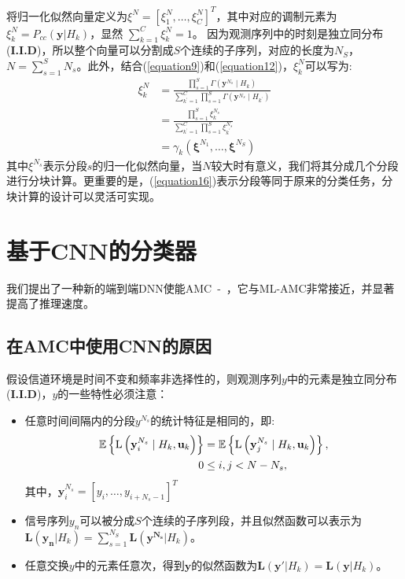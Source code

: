 \documentclass[final]{cvpr}
\begin{document}
将归一化似然向量定义为$\xi^N=[\xi^N_1,\dots,\xi^N_C]^T$，其中对应的调制元素为$\xi^N_k=P_{cc}(\mathbf{y}|H_k)$，显然
$\sum_{k=1}^C \xi^N_k = 1$。
因为观测序列中的时刻是独立同分布(\textbf{I.I.D})，所以整个向量可以分割成$S$个连续的子序列，对应的长度为$N_S$，$N=\sum^S_{s=1}N_s$。此外，结合(\ref{equation9})和(\ref{equation12})，$\xi^N_k$可以写为:
\begin{equation}
\begin{aligned}
\xi_{k}^{N} &=\frac{\prod_{s=1}^{S} \Gamma\left(\mathbf{y}^{N_{s}} \mid H_{k}\right)}{\sum_{k^{\prime}=1}^{C} \prod_{s=1}^{S} \Gamma\left(\mathbf{y}^{N_{s}} \mid H_{k^{\prime}}\right)} \\
&=\frac{\prod_{s=1}^{S} \xi_{k}^{N_{s}}}{\sum_{k^{\prime}=1}^{C} \prod_{s=1}^{S} \xi_{k^{\prime}}^{N_{s}}} \\
&=\gamma_{k}\left(\boldsymbol{\xi}^{N_{1}}, \ldots, \boldsymbol{\xi}^{N_{S}}\right)\label{equation16}
\end{aligned}
\end{equation}
其中$\xi^{N_s}$表示分段$s$的归一化似然向量，当$N$较大时有意义，我们将其分成几个分段进行分块计算。更重要的是，(\ref{equation16})表示分段等同于原来的分类任务，分块计算的设计可以灵活可实现。

\section{基于CNN的分类器}\label{CNNClassifier}

我们提出了一种新的端到端DNN使能AMC~\cite{r32}-~\cite{r34}，它与ML-AMC非常接近，并显著提高了推理速度。
\subsection{在AMC中使用CNN的原因}\label{useCNNreason}

假设信道环境是时间不变和频率非选择性的，则观测序列$y$中的元素是独立同分布(\textbf{I.I.D})，$y$的一些特性必须注意：
\begin{itemize}
\item  任意时间间隔内的分段$y^{N_s}$的统计特征是相同的，即:
\begin{equation}
\begin{aligned}
\mathbb{E}\left\{\mathrm{L}\left(\mathbf{y}_{i}^{N_{s}} \mid H_{k}, \mathbf{u}_{k}\right)\right\} &=\mathbb{E}\left\{\mathrm{L}\left(\mathbf{y}_{j}^{N_{s}} \mid H_{k}, \mathbf{u}_{k}\right)\right\}, \\
0 & \leq i, j<N-N_{s},\notag
\end{aligned}
\end{equation}
其中，$\boldsymbol{y}_i^{N_s}=[y_i,\dots,y_{i+N_s−1}]^T$
\item  信号序列$y_n$可以被分成$S$个连续的子序列段，并且似然函数可以表示为$\boldsymbol{L}(\boldsymbol{y_n}|H_k)=\sum^{N_S}_{s=1}\boldsymbol{L}(\boldsymbol{y^{N_s}}|H_k)$。
\item  任意交换$y$中的元素任意次，得到$\boldsymbol{y}$的似然函数为$\boldsymbol{L}(\boldsymbol{y}'|H_k)=\boldsymbol{L}(\boldsymbol{y}|H_k)$。
\end{itemize}
\end{document}
